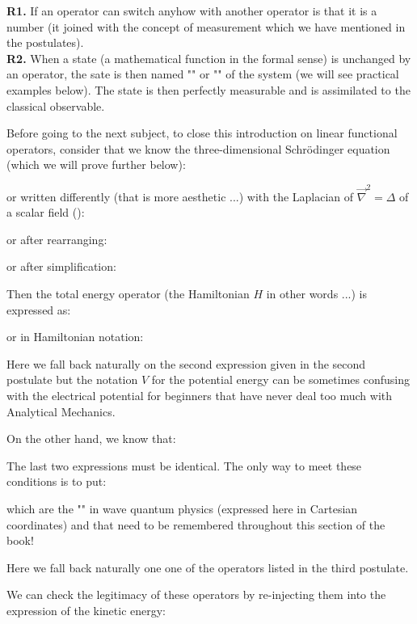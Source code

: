 	\begin{tcolorbox}[title=Remarks,colframe=black,arc=10pt]
	\textbf{R1.} If an operator can switch anyhow with another operator is that it is a number (it joined with the concept of measurement which we have mentioned in the postulates).\\
	
	\textbf{R2.} When a state (a mathematical function in the formal sense) is unchanged by an operator, the sate is then named "" or "" of the system (we will see practical examples below). The state is then perfectly measurable and is assimilated to the classical observable.
	\end{tcolorbox}
	Before going to the next subject, to close this introduction on linear functional operators, consider that we know the three-dimensional Schrödinger equation (which we will prove further below):
	
	or written differently (that is more aesthetic ...) with the Laplacian of $\vec{\nabla}^2=\Delta$ of a scalar field ():
	
	or after rearranging:
	
	or after simplification:
	
	Then the total energy operator  (the Hamiltonian $H$ in other words ...) is expressed as:
	
	or in Hamiltonian notation:
	
	\begin{tcolorbox}[title=Remark,colframe=black,arc=10pt]
	Here we fall back naturally on the second expression given in the second postulate but the notation $V$ for the potential energy can be sometimes confusing with the electrical potential for beginners that have never deal too much with Analytical Mechanics.
	\end{tcolorbox}
	On the other hand, we know that:
	
	The last two expressions must be identical. The only way to meet these conditions is to put:
	
	which are the "" in wave quantum physics (expressed here in Cartesian coordinates) and that need to be remembered throughout this section of the book!
	\begin{tcolorbox}[title=Remark,colframe=black,arc=10pt]
	Here we fall back naturally one one of the operators listed in the third postulate.
	\end{tcolorbox}
	We can check the legitimacy of these operators by re-injecting them into the expression of the kinetic energy:
	
